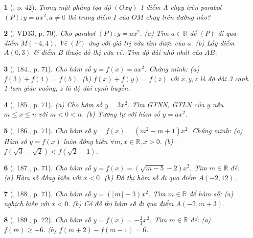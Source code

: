 \documentclass{article}
\newtheorem{baitoan}{}
\begin{document}
\begin{baitoan}[\cite{Binh_boi_duong_Toan_9_tap_2}, p. 42]
	Trong mặt phẳng tọa độ $(Oxy)$ 1 điểm A chạy trên parabol $(P):y = ax^2,a\ne0$ thì trung điểm $I$ của $OM$ chạy trên đường nào?
\end{baitoan}

\begin{baitoan}[\cite{Tuyen_Toan_9_old}, VD33, p. 70]
	Cho parabol $(P):y = ax^2$. (a) Tìm $a\in\mathbb{R}$ để $(P)$ đi qua điểm $M(-4,4)$. Vẽ $(P)$ ứng với giá trị vừa tìm được của $a$. (b) Lấy điểm $A(0,3)$ \& điểm B thuộc đồ thị vừa vẽ. Tìm độ dài nhỏ nhất của $AB$.
\end{baitoan}

\begin{baitoan}[\cite{Tuyen_Toan_9_old}, 184., p. 71]
	Cho hàm số $y = f(x) = ax^2$. Chứng minh: (a) $f(3) + f(4) = f(5)$. (b) $f(x) + f(y) = f(z)$ với $x,y,z$ là độ dài 3 cạnh 1 tam giác vuông, $z$ là độ dài cạnh huyền.
\end{baitoan}

\begin{baitoan}[\cite{Tuyen_Toan_9_old}, 185., p. 71]
	(a) Cho hàm số $y = 3x^2$. Tìm {\rm GTNN, GTLN} của $y$ nếu $m\le x\le n$ với $m < 0 < n$. (b) Tương tự với hàm số $y = ax^2$.
\end{baitoan}

\begin{baitoan}[\cite{Tuyen_Toan_9_old}, 186., p. 71]
	Cho hàm số $y = f(x) = (m^2 - m + 1)x^2$. Chứng minh: (a) Hàm số $y = f(x)$ luôn đồng biến $\forall m,x\in\mathbb{R},x > 0$. (b) $f(\sqrt{3} - \sqrt{2}) < f(\sqrt{2} - 1)$.
\end{baitoan}

\begin{baitoan}[\cite{Tuyen_Toan_9_old}, 187., p. 71]
	Cho hàm số $y = f(x) = (\sqrt{m - 5} - 2)x^2$. Tìm $m\in\mathbb{R}$ để: (a) Hàm số đồng biến với $x < 0$. (b) Đồ thị hàm số đi qua điểm $A(-2,12)$.
\end{baitoan}

\begin{baitoan}[\cite{Tuyen_Toan_9_old}, 188., p. 71]
	Cho hàm số $y = (\lfloor m\rfloor - 3)x^2$. Tìm $m\in\mathbb{R}$ để hàm số: (a) nghịch biến với $x < 0$. (b) Có đồ thị hàm số đi qua điểm $A(-2,m + 3)$.
\end{baitoan}

\begin{baitoan}[\cite{Tuyen_Toan_9_old}, 189., p. 72]
	Cho hàm số $y = f(x) = -\frac{2}{3}x^2$. Tìm $m\in\mathbb{R}$ để: (a) $f(m)\ge-6$. (b) $f(m + 2) - f(m - 1) = 6$.
\end{baitoan}
\end{document}
